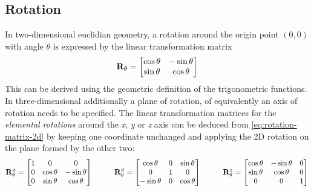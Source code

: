 \subsection{Rotation}
In two-dimensional euclidian geometry, a rotation around the origin point $(0, 0)$ with angle $\theta$ is expressed by the linear transformation matrix
\begin{equation}
\mathbf{R}_{\theta} = \left[ \begin{matrix}
	\cos \theta & - \sin \theta \\
	\sin \theta & \cos \theta
\end{matrix} \right]
\label{eq:rotation-matrix-2d}
\end{equation}
This can be derived using the geometric definition of the trigonometric functions. In three-dimensional additionally a plane of rotation, of equivalently an axis of rotation needs to be specified. The linear transformation matrices for the \emph{elemental rotations} around the \emph{x}, \emph{y} or \emph{z} axis can be deduced from \ref{eq:rotation-matrix-2d} by keeping one coordinate unchanged and applying the 2D rotation on the plane formed by the other two:
\begin{equation}
\mathbf{R}_{\theta}^x = \left[ \begin{matrix}
	1 & 0 & 0 \\
	0 & \cos \theta & - \sin \theta \\
	0 & \sin \theta & \cos \theta
\end{matrix} \right]
\hspace{1cm}
\mathbf{R}_{\theta}^y = \left[ \begin{matrix}
	\cos \theta & 0 & \sin \theta \\
	0 & 1 & 0 \\
	- \sin \theta & 0 & \cos \theta
\end{matrix} \right]
\hspace{1cm}
\mathbf{R}_{\theta}^z = \left[ \begin{matrix}
	\cos \theta & - \sin \theta & 0 \\
	\sin \theta & \cos \theta & 0 \\
	0 & 0 & 1
\end{matrix} \right]
\end{equation}


